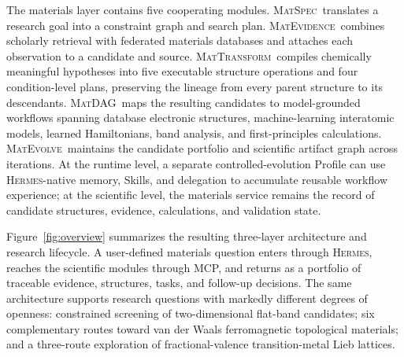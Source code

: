 \documentclass[11pt]{article}
\newcommand{\hermes}{\textsc{Hermes}}
\newcommand{\matspec}{\textsc{MatSpec}}
\newcommand{\matevidence}{\textsc{MatEvidence}}
\newcommand{\mattransform}{\textsc{MatTransform}}
\newcommand{\matdag}{\textsc{MatDAG}}
\newcommand{\matevolve}{\textsc{MatEvolve}}
\begin{document}
The materials layer contains five cooperating modules. \matspec\ translates a research goal into a constraint graph and search plan. \matevidence\ combines scholarly retrieval with federated materials databases and attaches each observation to a candidate and source. \mattransform\ compiles chemically meaningful hypotheses into five executable structure operations and four condition-level plans, preserving the lineage from every parent structure to its descendants. \matdag\ maps the resulting candidates to model-grounded workflows spanning database electronic structures, machine-learning interatomic models, learned Hamiltonians, band analysis, and first-principles calculations. \matevolve\ maintains the candidate portfolio and scientific artifact graph across iterations. At the runtime level, a separate controlled-evolution Profile can use \hermes-native memory, Skills, and delegation to accumulate reusable workflow experience; at the scientific level, the materials service remains the record of candidate structures, evidence, calculations, and validation state.

Figure~\ref{fig:overview} summarizes the resulting three-layer architecture and research lifecycle. A user-defined materials question enters through \hermes, reaches the scientific modules through MCP, and returns as a portfolio of traceable evidence, structures, tasks, and follow-up decisions. The same architecture supports research questions with markedly different degrees of openness: constrained screening of two-dimensional flat-band candidates; six complementary routes toward van der Waals ferromagnetic topological materials; and a three-route exploration of fractional-valence transition-metal Lieb lattices.
\end{document}
